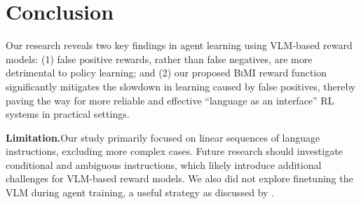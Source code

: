 \documentclass{article}
\theoremstyle{plain}
\theoremstyle{definition}
\theoremstyle{remark}
\begin{document}
\section{Conclusion}
Our research reveals two key findings in agent learning using VLM-based reward models: (1) false positive rewards, rather than false negatives, are more detrimental to policy learning; and (2) our proposed \textsc{BiMI} reward function significantly mitigates the slowdown in learning caused by false positives, thereby paving the way for more reliable and effective ``language as an interface'' RL systems in practical settings.

\noindent\textbf{Limitation.}\quad Our study primarily focused on linear sequences of language instructions, excluding more complex cases. Future research should investigate conditional and ambiguous instructions, which likely introduce additional challenges for VLM-based reward models. We also did not explore finetuning the VLM during agent training, a useful strategy as discussed by \citet{fufurl2024}.


\pagebreak
\appendix
\end{document}
